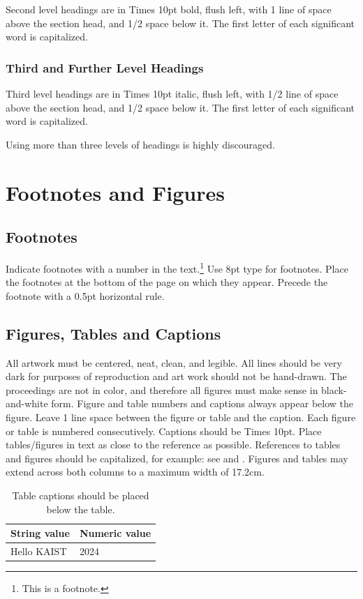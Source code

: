 \documentclass{article}
\begin{document}
Second level headings are in Times 10pt bold, flush left,
with 1 line of space above the section head, and 1/2 space below it.
The first letter of each significant word is capitalized.

\subsubsection{Third and Further Level Headings}

Third level headings are in Times 10pt italic, flush left,
with 1/2 line of space above the section head, and 1/2 space below it.
The first letter of each significant word is capitalized.

Using more than three levels of headings is highly discouraged.

\section{Footnotes and Figures}

\subsection{Footnotes}

Indicate footnotes with a number in the text.\footnote{This is a footnote.}
Use 8pt type for footnotes. Place the footnotes at the bottom of the page on which they appear.
Precede the footnote with a 0.5pt horizontal rule.

\subsection{Figures, Tables and Captions}

All artwork must be centered, neat, clean, and legible.
All lines should be very dark for purposes of reproduction and art work should not be hand-drawn.
The proceedings are not in color, and therefore all figures must make sense in black-and-white form.
Figure and table numbers and captions always appear below the figure.
Leave 1 line space between the figure or table and the caption.
Each figure or table is numbered consecutively. Captions should be Times 10pt.
Place tables/figures in text as close to the reference as possible.
References to tables and figures should be capitalized, for example:
see  and .
Figures and tables may extend across both columns to a maximum width of 17.2cm.

\begin{table}
 \begin{center}
 \begin{tabular}{|l|l|}
  \hline
  String value & Numeric value \\
  \hline
  Hello KAIST  & 2024 \\
  \hline
 \end{tabular}
\end{center}
 \caption{Table captions should be placed below the table.}
 \label{tab:example}
\end{table}
\end{document}
